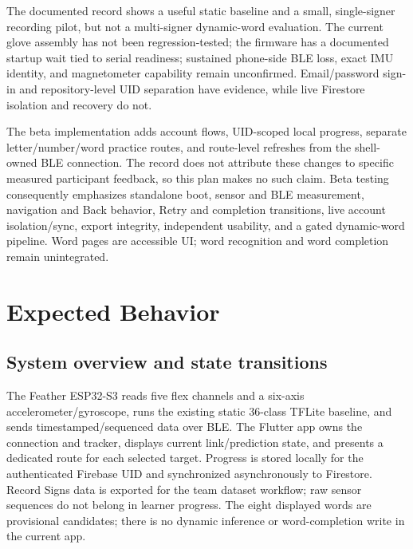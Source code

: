 \documentclass[10pt,letterpaper]{article}
\begin{document}
The documented record shows a useful static baseline and a small, single-signer recording pilot, but not a multi-signer dynamic-word evaluation. The current glove assembly has not been regression-tested; the firmware has a documented startup wait tied to serial readiness; sustained phone-side BLE loss, exact IMU identity, and magnetometer capability remain unconfirmed. Email/password sign-in and repository-level UID separation have evidence, while live Firestore isolation and recovery do not.

The beta implementation adds account flows, UID-scoped local progress, separate letter/number/word practice routes, and route-level refreshes from the shell-owned BLE connection. The record does not attribute these changes to specific measured participant feedback, so this plan makes no such claim. Beta testing consequently emphasizes standalone boot, sensor and BLE measurement, navigation and Back behavior, Retry and completion transitions, live account isolation/sync, export integrity, independent usability, and a gated dynamic-word pipeline. Word pages are accessible UI; word recognition and word completion remain unintegrated.

\section{Expected Behavior}
\subsection{System overview and state transitions}
The Feather ESP32-S3 reads five flex channels and a six-axis accelerometer/gyroscope, runs the existing static 36-class TFLite baseline, and sends timestamped/sequenced data over BLE. The Flutter app owns the connection and tracker, displays current link/prediction state, and presents a dedicated route for each selected target. Progress is stored locally for the authenticated Firebase UID and synchronized asynchronously to Firestore. Record Signs data is exported for the team dataset workflow; raw sensor sequences do not belong in learner progress. The eight displayed words are provisional candidates; there is no dynamic inference or word-completion write in the current app.
\end{document}
